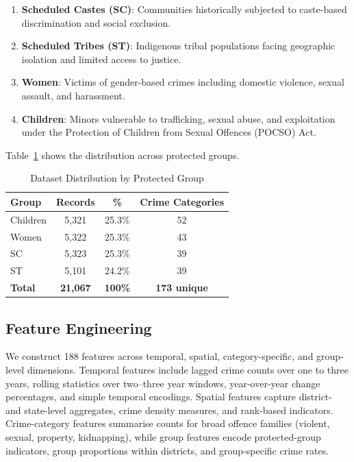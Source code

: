 \documentclass{svproc}
\begin{document}
\begin{enumerate}
\item \textbf{Scheduled Castes (SC)}: Communities historically subjected to caste-based discrimination and social exclusion.
\item \textbf{Scheduled Tribes (ST)}: Indigenous tribal populations facing geographic isolation and limited access to justice.
\item \textbf{Women}: Victims of gender-based crimes including domestic violence, sexual assault, and harassment.
\item \textbf{Children}: Minors vulnerable to trafficking, sexual abuse, and exploitation under the Protection of Children from Sexual Offences (POCSO) Act.
\end{enumerate}

Table~\ref{tab:group_distribution} shows the distribution across protected groups.

\begin{table}[htbp]
\caption{Dataset Distribution by Protected Group}
\label{tab:group_distribution}
\centering
\begin{tabular}{lccc}
\toprule
\textbf{Group} & \textbf{Records} & \textbf{\%} & \textbf{Crime Categories} \\
\midrule
Children & 5,321 & 25.3\% & 52 \\
Women & 5,322 & 25.3\% & 43 \\
SC & 5,323 & 25.3\% & 39 \\
ST & 5,101 & 24.2\% & 39 \\
\midrule
\textbf{Total} & \textbf{21,067} & \textbf{100\%} & \textbf{173 unique} \\
\bottomrule
\end{tabular}
\end{table}

\subsection{Feature Engineering}

We construct 188 features across temporal, spatial, category-specific, and group-level dimensions. Temporal features include lagged crime counts over one to three years, rolling statistics over two–three year windows, year-over-year change percentages, and simple temporal encodings. Spatial features capture district- and state-level aggregates, crime density measures, and rank-based indicators. Crime-category features summarise counts for broad offence families (violent, sexual, property, kidnapping), while group features encode protected-group indicators, group proportions within districts, and group-specific crime rates.
\end{document}
